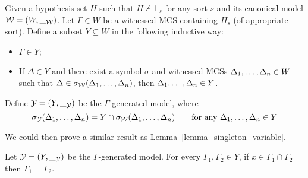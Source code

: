 \documentclass{amsart}
\begin{document}
\begin{definition}
Given a hypothesis set $H$ 
such that $H \not\vdash \bot_s$ for any sort $s$
and its canonical model $\mathcal{W} = (W,\__{\mathcal{W}})$.
Let $\Gamma \in W$ be a witnessed MCS containing $H_s$
(of appropriate sort).
Define a subset $Y \subseteq W$ in the following inductive way:
\begin{itemize}
\item $\Gamma \in Y$;
\item If $\Delta \in Y$ and there exist a symbol $\sigma$
      and witnessed MCSs $\Delta_1 ,\dots, \Delta_n \in W$ such that
      $\Delta \in {\sigma_{\mathcal{W}}}(\Delta_1 ,\dots, \Delta_n)$,
      then $\Delta_1 ,\dots, \Delta_n \in Y$.
\end{itemize}
Define $\mathcal{Y} = (Y, \__{\mathcal{Y}})$
be the ${\Gamma}$-generated model, where
$$
{\sigma_{\mathcal{Y}}}(\Delta_1 ,\dots, \Delta_n) = Y \cap {\sigma_{\mathcal{W}}}(\Delta_1 ,\dots, \Delta_n)
\qquad \text{for any $\Delta_1 ,\dots, \Delta_n \in Y$}
$$
\end{definition}

We could then prove a similar result as Lemma~\ref{lemma_singleton_variable}.
\begin{lemma}
\label{lemma_singleton_variable_two}
Let $\mathcal{Y} = (Y, \__{\mathcal{Y}})$ be the $\Gamma$-generated model.
For every $\Gamma_1, \Gamma_2 \in Y$, if $x \in \Gamma_1 \cap \Gamma_2$ 
then $\Gamma_1 = \Gamma_2$. 
\end{lemma}
\end{document}
